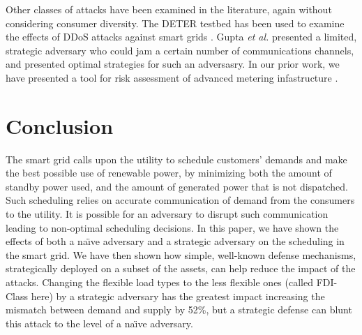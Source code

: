 \documentclass[conference]{IEEEtran}
\begin{document}
Other classes of attacks have been examined in the literature, again without considering consumer diversity. The DETER testbed has been used to examine the effects of DDoS attacks against smart grids \cite{hussain2012ncs}. Gupta {\em et al.} \cite{gupta2010optimal} presented a limited, strategic adversary who could jam a certain number of communications channels, and presented optimal strategies for such an adversasry. 
In our prior work, we have presented a tool for risk assessment of advanced metering infastructure \cite{shawly2014risk}.


\section{Conclusion}
\label{Conclusion}

The smart grid calls upon the utility to schedule customers' demands and make the best possible use of renewable power, by minimizing both the amount of standby power used, and the amount of generated power that is not dispatched. Such scheduling relies on accurate communication of demand from the consumers to the utility. It is possible for an adversary to disrupt such communication leading to non-optimal scheduling decisions. In this paper, we have shown the effects of both a na\"\i ve adversary and a strategic adversary on the scheduling in the smart grid. We have then shown how simple, well-known defense mechanisms, strategically deployed on a subset of the assets, can help reduce the impact of the attacks. Changing the flexible load types to the less flexible ones (called FDI-Class here) by a strategic adversary has the greatest impact increasing the mismatch between demand and supply by 52\%, but a strategic defense can blunt this attack to the level of a na\"\i ve adversary.

{\footnotesize


}
\end{document}
